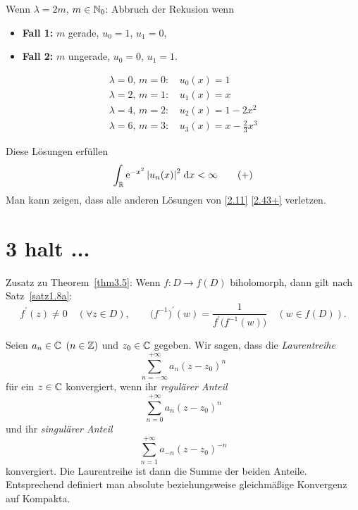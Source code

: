 \documentclass[a4paper,twoside,DIV15,BCOR12mm]{scrbook}
\begin{document}
\begin{bsp}
Wenn $\lambda=2m$, $m\in\mathbb{N}_0$: Abbruch der Rekusion wenn
\begin{itemize}
\item[] \textbf{Fall 1:} $m$ gerade, $u_0=1$, $u_1=0$,
\item[] \textbf{Fall 2:} $m$ ungerade, $u_0=0$, $u_1=1$.
\end{itemize}

\vspace*{-16pt}
\begin{align*}
\lambda=0,\,m=0\colon\,&u_0(x)=1\\
\lambda=2,\,m=1\colon\,&u_1(x)=x\\
\lambda=4,\,m=2\colon\,&u_2(x)=1-2x^2\\
\lambda=6,\,m=3\colon\,&u_3(x)=x-\frac{2}{3}x^3
\end{align*}

Diese Lösungen erfüllen
\[\label{2.43+}\int_{\mathbb{R}}^{}{\mathrm{e}^{-x^2}\left\lvert u_n(x)\right\lvert^2}\;\mathrm{d} x<\infty\tag{+}\]
Man kann zeigen, dass alle anderen Lösungen von \eqref{2.11} \eqref{2.43+} verletzen.
\end{bsp}


\chapter{3 halt ...}


Zusatz zu Theorem~\ref{thm3.5}: Wenn $f\colon D\to f(D)$ biholomorph, dann gilt nach Satz~\ref{satz1.8a}:
\[f^\prime(z)\neq 0\quad(\forall z\in D),\qquad\bigl(f^{-1}\bigr)^\prime(w)=\frac{1}{f^\prime\bigl(f^{-1}(w)\bigr)}\quad(w\in f(D)).\]

Seien $a_n\in\mathbb{C}$ $(n\in\mathbb{Z})$ und $z_0\in\mathbb{C}$ gegeben. Wir sagen, dass die \textit{Laurentreihe}
\[\sum_{n=-\infty}^{+\infty}a_n(z-z_0)^n\]
für ein $z\in\mathbb{C}$ konvergiert, wenn ihr \textit{regulärer Anteil}
\[\sum_{n=0}^{+\infty}a_n(z-z_0)^n\]
und ihr \textit{singulärer Anteil}
\[\sum_{n=1}^{+\infty}a_{-n}(z-z_0)^{-n}\]
konvergiert. Die Laurentreihe ist dann die Summe der beiden Anteile. Entsprechend definiert man absolute beziehungsweise gleichmäßige Konvergenz auf Kompakta.
\end{document}
